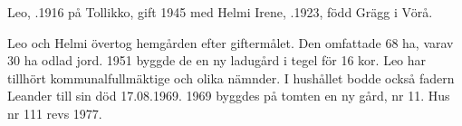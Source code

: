 
%
Leo, .1916 på Tollikko, gift 1945 med Helmi Irene, .1923, född Grägg i Vörå.
\begin{jhchildren}
  \item {}
  \item {}
  \item {}
  \item {}
  \item {}
\end{jhchildren}
Leo och Helmi övertog hemgården efter giftermålet. Den omfattade 68 ha, varav 30 ha odlad jord. 1951 byggde de en ny ladugård i tegel för 16 kor. Leo har tillhört kommunalfullmäktige och olika nämnder. I hushållet bodde också fadern Leander till sin död 17.08.1969. 1969 byggdes på tomten en ny gård, nr 11. Hus nr 111 revs 1977.


